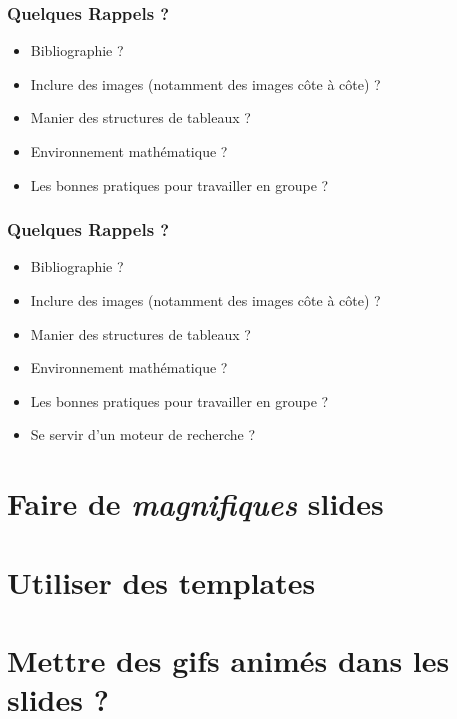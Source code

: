 \documentclass[handout]{beamer}
\begin{document}
	\begin{frame}
		\frametitle{Quelques Rappels ?}
		\begin{itemize}
			\item Bibliographie ?
			\item Inclure des images (notamment des images côte à côte) ?
			\item Manier des structures de tableaux ?
			\item Environnement mathématique ?
			\item Les bonnes pratiques pour travailler en groupe ?
		\end{itemize}
	\end{frame}

	\begin{frame}
		\frametitle{Quelques Rappels ?}
		\begin{itemize}
			\item Bibliographie ?
			\item Inclure des images (notamment des images côte à côte) ?
			\item Manier des structures de tableaux ?
			\item Environnement mathématique ?
			\item Les bonnes pratiques pour travailler en groupe ?
			\item Se servir d'un moteur de recherche ?
		\end{itemize}
	\end{frame}

\section{Faire de \emph{magnifiques} slides}

\section{Utiliser des templates}

\section{Mettre des gifs animés dans les slides ?}
\end{document}
